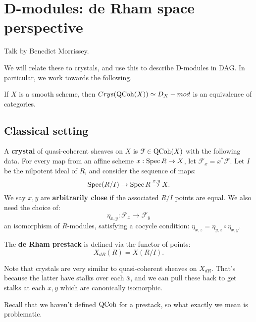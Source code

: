 \chapter{D-modules: de Rham space perspective}
Talk by Benedict Morrissey.

We will relate these to crystals, and use this to describe D-modules in DAG. In particular, we work towards the following.

\begin{thm}
If $X$ is a smooth scheme, then $Crys(\mathrm{QCoh}(X)) \simeq D_X - mod$ is an equivalence of categories.
\end{thm}

\section{Classical setting}
\label{sect:dmod_class}

\begin{defin}
A \textbf{crystal} of quasi-coherent sheaves on $X$ is $\mathcal{F} \in \mathrm{QCoh}(X)$ with the following data. For every map
from an affine scheme $x : \operatorname{Spec} R \to X$, let $\mathcal{F}_x = x^* \mathcal{F}$. Let $I$ be the nilpotent ideal of $R$,
and consider the sequence of maps:
\[	\operatorname{Spec} (R/I) \to \operatorname{Spec} R \overset{x,y}{\to} X.	\]
We say $x,y$ are \textbf{arbitrarily close} if the associated $R/I$ points are equal. We also need the choice of:
\[	\eta_{x,y} : \mathcal{F}_x \to \mathcal{F}_y	\]
an isomorphism of $R$-modules, satisfying a cocycle condition: $\eta_{x,z} = \eta_{y,z} \circ \eta_{x,y}$.
\end{defin}

\begin{defin}
The \textbf{de Rham prestack} is defined via the functor of points:
\[	X_{dR}(R) = X(R/I) .	\]
\end{defin}

Note that crystals are very similar to quasi-coherent sheaves on $X_{dR}$. That's because the latter have stalks
over each $\bar x$, and we can pull these back to get stalks at each $x, y$ which are canonically isomorphic.

\begin{rem}
Recall that we haven't defined $\mathrm{QCoh}$ for a prestack, so what exactly we mean is problematic.
\end{rem}

